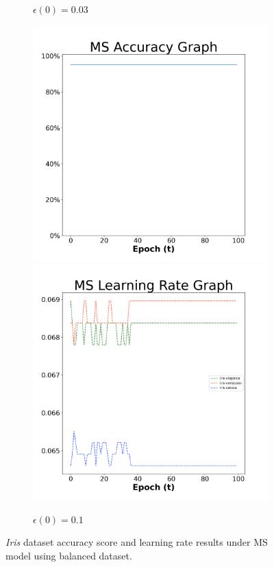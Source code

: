 \begin{figure}[H]
\begin{subfigure}{0.3\textwidth}
  \caption{$\epsilon(0)=0.03$}
\end{subfigure}\hfil %
\begin{subfigure}{0.3\textwidth}
  \includegraphics[width=\linewidth]{images/exper1/iris/MS_0.1_acc.png}
  \includegraphics[width=\linewidth]{images/exper1/iris/MS_0.1_lr.png}
  \caption{$\epsilon(0)=0.1$}
\end{subfigure}

\caption{\textit{Iris} dataset accuracy score and learning rate results under MS model using balanced dataset.}
\end{figure}

